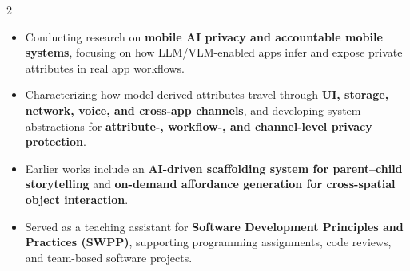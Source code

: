 \documentclass[10pt,a4paper,withhyper]{altacv}
\begin{document}
\begin{paracol}{2}



\begin{itemize}
  \item Conducting research on \textbf{mobile AI privacy and accountable mobile systems}, focusing on how LLM/VLM-enabled apps infer and expose private attributes in real app workflows.
  \item Characterizing how model-derived attributes travel through \textbf{UI, storage, network, voice, and cross-app channels}, and developing system abstractions for \textbf{attribute-, workflow-, and channel-level privacy protection}.
  \item Earlier works include an \textbf{AI-driven scaffolding system for parent--child storytelling} and \textbf{on-demand affordance generation for cross-spatial object interaction}.
\end{itemize}

\divider

\begin{itemize}
  \item Served as a teaching assistant for \textbf{Software Development Principles and Practices (SWPP)}, supporting programming assignments, code reviews, and team-based software projects.
\end{itemize}

\divider



\end{paracol}
\end{document}
